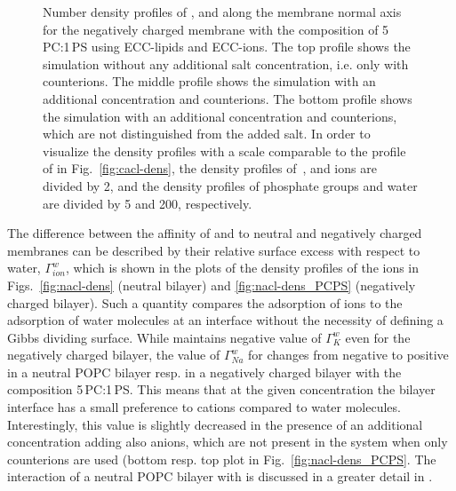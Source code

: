 \begin{figure}[tbp!]
{    Number density profiles of ,  and  along the membrane normal axis 
    for the negatively charged membrane with the composition of 5\,PC:1\,PS using ECC-lipids and ECC-ions.  
    The top profile shows the simulation without any additional salt concentration, i.e. only with  counterions. 
    The middle profile shows the simulation with an additional  concentration and  counterions. 
    The bottom profile shows the simulation with an additional  concentration and  counterions, which are not distinguished from the added salt. 
    In order to visualize the density profiles with a scale comparable to the profile of  in Fig.~\ref{fig:cacl-dens},  
    the density profiles of~,  and  ions are divided by 2, and 
    the density profiles of phosphate groups and water are divided by 5 and 200, respectively.  
    } 
\end{figure} 



The difference between the affinity of  and  to neutral and negatively charged membranes
can be described by their relative surface excess with respect to water, $\Gamma ^{w} _{ion}$, 
which is shown in the plots of the density profiles of the ions in Figs.~\ref{fig:nacl-dens} (neutral bilayer) and \ref{fig:nacl-dens_PCPS} (negatively charged bilayer). 
Such a quantity compares the adsorption of ions to the adsorption of water molecules at an interface 
without the necessity of defining a Gibbs dividing surface. \citep{melcr18, chattorajBOOK}
While  maintains negative value of $\Gamma^{w}_{K}$ even for the negatively charged bilayer,
the value of $\Gamma^{w}_{Na}$ for  changes from negative to positive
in a neutral POPC bilayer resp. in a negatively charged bilayer with the composition 5\,PC:1\,PS.
This means that at the given concentration the bilayer interface has a small preference to  cations compared to water molecules. 
Interestingly, this value is slightly decreased in the presence of an additional  concentration adding also  anions, 
which are not present in the system when only counterions are used
(bottom resp. top plot in Fig.~\ref{fig:nacl-dens_PCPS}. 
The interaction of a neutral POPC bilayer with  is discussed in a greater detail in \citep{melcr18}. 

 





 
 


